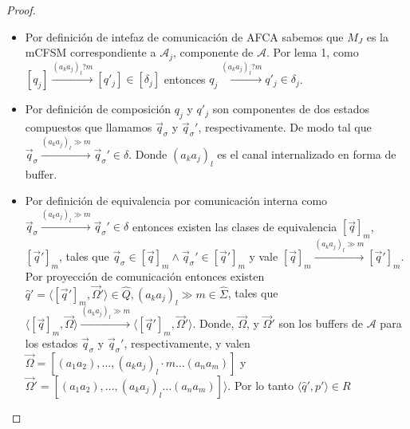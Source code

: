 \begin{proof}
\begin{itemize}
    \item Por definición de intefaz de comunicación de AFCA sabemos que $M_J$ es la mCFSM correspondiente a $\mathcal{A}_j$, componente de $\mathcal{A}$. Por lema 1, como $[q_j] \xrightarrow{(a_ka_j)_l?m} [q'_j] \in [\delta_j]$ entonces $q_j \xrightarrow{(a_ka_j)_l?m} q'_j \in \delta_j$.
    
    \item Por definición de composición $q_j$ y $q'_j$ son componentes de dos estados compuestos que llamamos $\overrightarrow{q}_{\sigma}$ y $\overrightarrow{q}_{\sigma}'$, respectivamente. De modo tal que $\overrightarrow{q}_{\sigma} \xrightarrow{(a_ka_j)_l \gg m} \overrightarrow{q}_{\sigma}' \in \delta$. Donde $(a_ka_j)_l$ es el canal internalizado en forma de buffer.
    
    \item Por definición de equivalencia por comunicación interna como $\overrightarrow{q}_{\sigma} \xrightarrow{(a_ka_j)_l \gg m} \overrightarrow{q}_{\sigma}' \in \delta$ entonces existen las clases de equivalencia $[\overrightarrow{q}]_m$, $[\overrightarrow{q}']_m$, tales que $\overrightarrow{q}_{\sigma} \in [\overrightarrow{q}]_m \land \overrightarrow{q}_{\sigma}' \in [\overrightarrow{q}']_m$ y vale $[\overrightarrow{q}]_m \xrightarrow{(a_ka_j)_l \gg m} [\overrightarrow{q}']_m$. Por proyección de comunicación entonces existen $\widehat{q}' = \langle [\overrightarrow{q}']_m, \overrightarrow{\Omega}' \rangle \in \widehat{Q}, (a_ka_j)_l \gg m \in \widehat{\Sigma}$, tales que $\langle [\overrightarrow{q}]_m, \overrightarrow{\Omega} \rangle \xrightarrow{(a_ka_j)_l \gg m} \langle [\overrightarrow{q}']_m, \overrightarrow{\Omega}' \rangle$. Donde, $\overrightarrow{\Omega}$, y $\overrightarrow{\Omega}'$ son los buffers de $\mathcal{A}$ para los estados $\overrightarrow{q}_{\sigma}$ y  $\overrightarrow{q}_{\sigma}'$, respectivamente, y valen $\overrightarrow{\Omega} = [(a_1a_2), \ldots, (a_ka_j)_l \cdot m \ldots (a_na_m)]$ y $\overrightarrow{\Omega}' = [(a_1a_2), \ldots, (a_ka_j)_l \ldots (a_na_m)] \rangle$. Por lo tanto $\langle \widehat{q}', p' \rangle \in R$ 
    
    
\end{itemize}
\end{proof}


